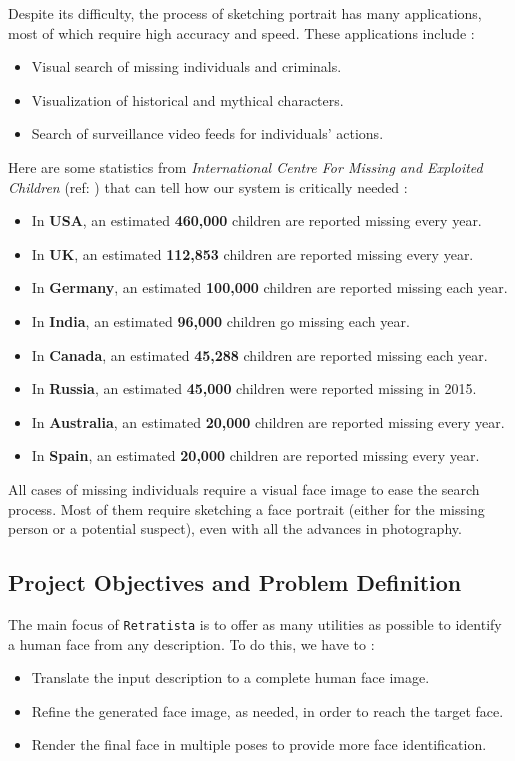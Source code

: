 Despite its difficulty, the process of sketching portrait has many applications, most of which require high accuracy and speed. These applications include :
\begin{itemize}
    \item Visual search of missing individuals and criminals.
    \item Visualization of historical and mythical characters.
    \item Search of surveillance video feeds for individuals' actions.
\end{itemize}

Here are some statistics from \emph{International Centre For Missing and Exploited Children} (ref: ) that can tell how our system is critically needed :

\begin{itemize}
    \item In \textbf{USA}, an estimated \textbf{460,000} children are reported missing every year.
    \item In \textbf{UK}, an estimated \textbf{112,853} children are reported missing every year.
    \item In \textbf{Germany}, an estimated \textbf{100,000} children are reported missing each year.
    \item In \textbf{India}, an estimated \textbf{96,000} children go missing each year.
    \item In \textbf{Canada}, an estimated \textbf{45,288} children are reported missing each year.
    \item In \textbf{Russia}, an estimated \textbf{45,000} children were reported missing in 2015.
    \item In \textbf{Australia}, an estimated \textbf{20,000} children are reported missing every year.
    \item In \textbf{Spain}, an estimated \textbf{20,000} children are reported missing every year.
\end{itemize}

All cases of missing individuals require a visual face image to ease the search process. Most of them require sketching a face portrait (either for the missing person or a potential suspect), even with all the advances in photography.

\subsection{Project Objectives and Problem Definition}
The main focus of \texttt{Retratista} is to offer as many utilities as possible to identify a human face from any description. To do this, we have to :
\begin{itemize}
    \item Translate the input description to a complete human face image.
    \item Refine the generated face image, as needed, in order to reach the target face.
    \item Render the final face in multiple poses to provide more face identification.
\end{itemize}

